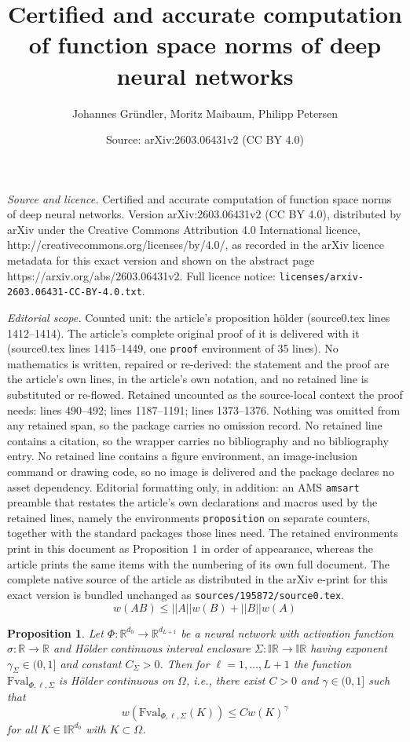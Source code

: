 \documentclass[10pt,a4paper]{amsart}
\title{Certified and accurate computation of function space norms of deep neural networks}
\author{Johannes Gr\"undler, Moritz Maibaum, Philipp Petersen}
\date{Source: arXiv:2603.06431v2 (CC BY 4.0)}
\newtheorem{proposition}{Proposition}
\begin{document}
\maketitle

\noindent\emph{Source and licence.} Certified and accurate computation of function space norms of deep neural networks. Version arXiv:2603.06431v2 (CC BY 4.0), distributed by arXiv under the Creative Commons Attribution 4.0 International licence, http://creativecommons.org/licenses/by/4.0/, as recorded in the arXiv licence metadata for this exact version and shown on the abstract page https://arxiv.org/abs/2603.06431v2. Full licence notice: \texttt{licenses/arxiv-2603.06431-CC-BY-4.0.txt}.\par\smallskip

\noindent\textit{Editorial scope.} Counted unit: the article's proposition hölder (source0.tex lines 1412--1414). The article's complete original proof of it is delivered with it (source0.tex lines 1415--1449, one \texttt{proof} environment of 35 lines). No mathematics is written, repaired or re-derived: the statement and the proof are the article's own lines, in the article's own notation, and no retained line is substituted or re-flowed.  Retained uncounted as the source-local context the proof needs: lines 490--492; lines 1187--1191; lines 1373--1376.  Nothing was omitted from any retained span, so the package carries no omission record.  No retained line contains a citation, so the wrapper carries no bibliography and no bibliography entry.  No retained line contains a figure environment, an image-inclusion command or drawing code, so no image is delivered and the package declares no asset dependency.  Editorial formatting only, in addition: an AMS \texttt{amsart} preamble that restates the article's own declarations and macros used by the retained lines, namely the environments \texttt{proposition} on separate counters, together with the standard packages those lines need.  The retained environments print in this document as Proposition 1 in order of appearance, whereas the article prints the same items with the numbering of its own full document.  The complete native source of the article as distributed in the arXiv e-print for this exact version is bundled unchanged as \texttt{sources/195872/source0.tex}.
		\begin{equation}\label{eq: matrix width inequality}
			w(AB) \leq ||A||w(B) + ||B||w(A)
		\end{equation}

	\begin{proposition}\label{prop: fval hölder}
		Let $\Phi : \mathbb{R}^{d_0} \to \mathbb{R}^{d_{L+1}}$ be a neural network with activation function $\sigma : \mathbb{R} \to \mathbb{R}$ and Hölder continuous interval enclosure $\Sigma:\mathbb{IR}\to \mathbb{IR}$ having exponent $\gamma_\Sigma \in (0,1]$ and constant $C_\Sigma > 0$. Then for $\ell=1,\dotsc,L+1$ the function $\mathrm{Fval}_{\Phi, \ell, \Sigma}$ is Hölder continuous on $\Omega$, i.e., there exist $C > 0$ and $\gamma \in (0,1]$ such that
		$$ w(\mathrm{Fval}_{\Phi, \ell, \Sigma}(K)) \leq C w(K)^{\gamma} $$
		for all $K \in \mathbb{IR}^{d_0}$ with $K \subset \Omega$.
	\end{proposition}
\end{document}
